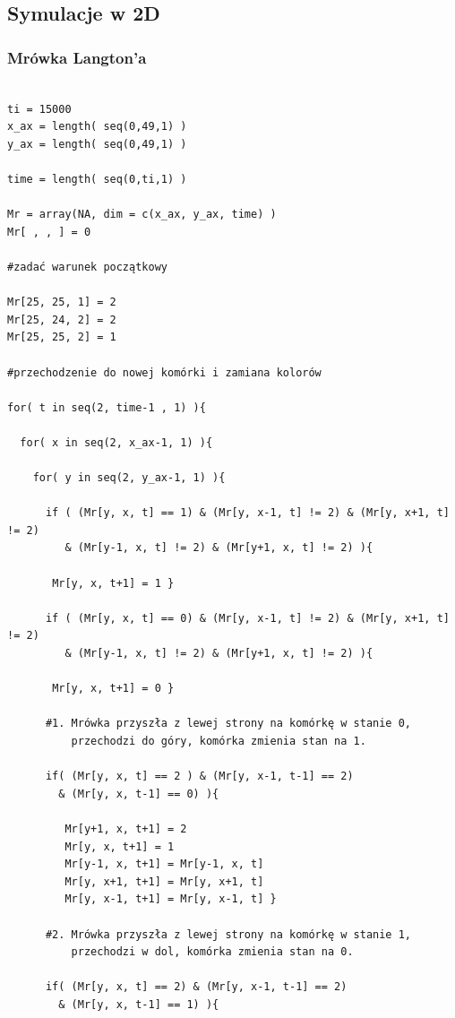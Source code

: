 \documentclass[a4paper,12pt]{article}
\begin{document}
\subsection{Symulacje w 2D}
\subsubsection{Mrówka Langton'a}
\begin{verbatim}

ti = 15000
x_ax = length( seq(0,49,1) )
y_ax = length( seq(0,49,1) )

time = length( seq(0,ti,1) )

Mr = array(NA, dim = c(x_ax, y_ax, time) )
Mr[ , , ] = 0

#zadać warunek początkowy

Mr[25, 25, 1] = 2
Mr[25, 24, 2] = 2
Mr[25, 25, 2] = 1

#przechodzenie do nowej komórki i zamiana kolorów

for( t in seq(2, time-1 , 1) ){
  
  for( x in seq(2, x_ax-1, 1) ){
    
    for( y in seq(2, y_ax-1, 1) ){
      
      if ( (Mr[y, x, t] == 1) & (Mr[y, x-1, t] != 2) & (Mr[y, x+1, t] != 2)
         & (Mr[y-1, x, t] != 2) & (Mr[y+1, x, t] != 2) ){
         
       Mr[y, x, t+1] = 1 }
      
      if ( (Mr[y, x, t] == 0) & (Mr[y, x-1, t] != 2) & (Mr[y, x+1, t] != 2)
         & (Mr[y-1, x, t] != 2) & (Mr[y+1, x, t] != 2) ){
         
       Mr[y, x, t+1] = 0 }
    
      #1. Mrówka przyszła z lewej strony na komórkę w stanie 0,
          przechodzi do góry, komórka zmienia stan na 1.
      
      if( (Mr[y, x, t] == 2 ) & (Mr[y, x-1, t-1] == 2)
        & (Mr[y, x, t-1] == 0) ){ 
        
         Mr[y+1, x, t+1] = 2
         Mr[y, x, t+1] = 1 
         Mr[y-1, x, t+1] = Mr[y-1, x, t] 
         Mr[y, x+1, t+1] = Mr[y, x+1, t] 
         Mr[y, x-1, t+1] = Mr[y, x-1, t] }
        
      #2. Mrówka przyszła z lewej strony na komórkę w stanie 1,
          przechodzi w dol, komórka zmienia stan na 0.
      
      if( (Mr[y, x, t] == 2) & (Mr[y, x-1, t-1] == 2)
        & (Mr[y, x, t-1] == 1) ){
      

\end{verbatim}
\end{document}
